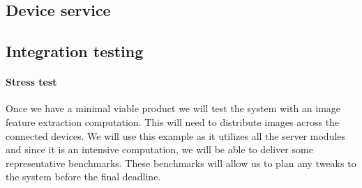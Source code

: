 \documentclass[
  twoside,
  10pt, a4paper
]{article}
\begin{document}

\subsection{Device service}


\subsection{Integration testing}
\paragraph{Stress test}

Once we have a minimal viable product we will test the system with an image feature extraction computation. This will need to distribute images across the connected devices.
We will use this example as it utilizes all the server modules and since it is an intensive computation, we will be able to deliver some representative benchmarks.
These benchmarks will allow us to plan any tweaks to the system before the final deadline.
\end{document}
